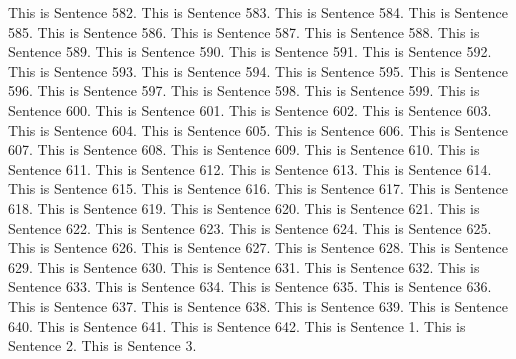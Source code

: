 \documentclass{article}
\begin{document}
This is Sentence 582.
This is Sentence 583.
This is Sentence 584.
This is Sentence 585.
This is Sentence 586.
This is Sentence 587.
This is Sentence 588.
This is Sentence 589.
This is Sentence 590.
This is Sentence 591.
This is Sentence 592.
This is Sentence 593.
This is Sentence 594.
This is Sentence 595.
This is Sentence 596.
This is Sentence 597.
This is Sentence 598.
This is Sentence 599.
This is Sentence 600.
This is Sentence 601.
This is Sentence 602.
This is Sentence 603.
This is Sentence 604.
This is Sentence 605.
This is Sentence 606.
This is Sentence 607.
This is Sentence 608.
This is Sentence 609.
This is Sentence 610.
This is Sentence 611.
This is Sentence 612.
This is Sentence 613.
This is Sentence 614.
This is Sentence 615.
This is Sentence 616.
This is Sentence 617.
This is Sentence 618.
This is Sentence 619.
This is Sentence 620.
This is Sentence 621.
This is Sentence 622.
This is Sentence 623.
This is Sentence 624.
This is Sentence 625.
This is Sentence 626.
This is Sentence 627.
This is Sentence 628.
This is Sentence 629.
This is Sentence 630.
This is Sentence 631.
This is Sentence 632.
This is Sentence 633.
This is Sentence 634.
This is Sentence 635.
This is Sentence 636.
This is Sentence 637.
This is Sentence 638.
This is Sentence 639.
This is Sentence 640.
This is Sentence 641.
This is Sentence 642.
This is Sentence 1.
This is Sentence 2.
This is Sentence 3.
\end{document}
